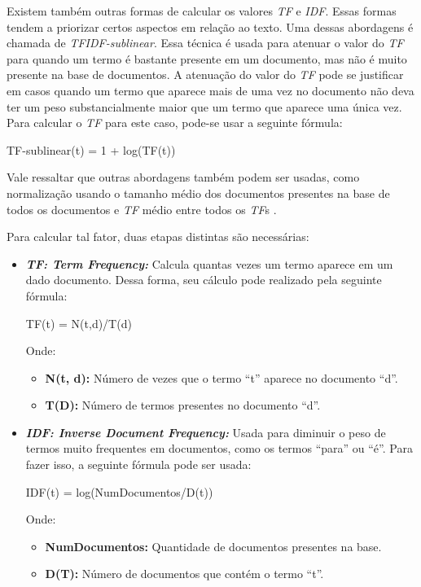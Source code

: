 \begin{anexosenv}
Existem também outras formas de calcular os valores \textit{TF} e \textit{IDF}.
Essas formas tendem a priorizar certos aspectos em relação ao texto. Uma dessas
abordagens é chamada de \textit{TFIDF-sublinear}. Essa técnica é usada para
atenuar o valor do \textit{TF} para quando um termo é bastante presente em um
documento, mas não é muito presente na base de documentos. A atenuação do valor
do \textit{TF} pode se justificar em casos quando um termo que aparece mais de
uma vez no documento não deva ter um peso substancialmente maior que um termo
que aparece uma única vez. Para calcular o \textit{TF} para este caso, pode-se
usar a seguinte fórmula:

TF-sublinear(t) = 1 + log(TF(t))

Vale ressaltar que outras abordagens também podem ser usadas, como normalização
usando o tamanho médio dos documentos presentes na base de todos os documentos e
\textit{TF} médio entre todos os \textit{TF}s \cite{araujo2011apprecommender}.

Para calcular tal fator, duas etapas distintas são necessárias:

\begin{itemize}
    \item \textbf{\textit{TF: Term Frequency: }} Calcula quantas vezes um termo
    aparece em um dado documento. Dessa forma, seu cálculo pode realizado pela
    seguinte fórmula:

    TF(t) = N(t,d)/T(d)

    Onde:
    \begin{itemize}
        \item \textbf{N(t, d): } Número de vezes que o termo ``t'' aparece no
        documento ``d''.
        \item \textbf{T(D): } Número de termos presentes no documento ``d''.
    \end{itemize}

    \item \textbf{\textit{IDF: Inverse Document Frequency: }} Usada para diminuir o
    peso de termos muito frequentes em documentos, como os termos ``para'' ou
    ``é''. Para fazer isso, a seguinte fórmula pode ser usada:

    IDF(t) = log(NumDocumentos/D(t))

    Onde:
    \begin{itemize}
        \item \textbf{NumDocumentos: } Quantidade de documentos presentes na
        base.
        \item \textbf{D(T): } Número de documentos que contém o termo ``t''.
    \end{itemize}
\end{itemize}


\end{anexosenv}
